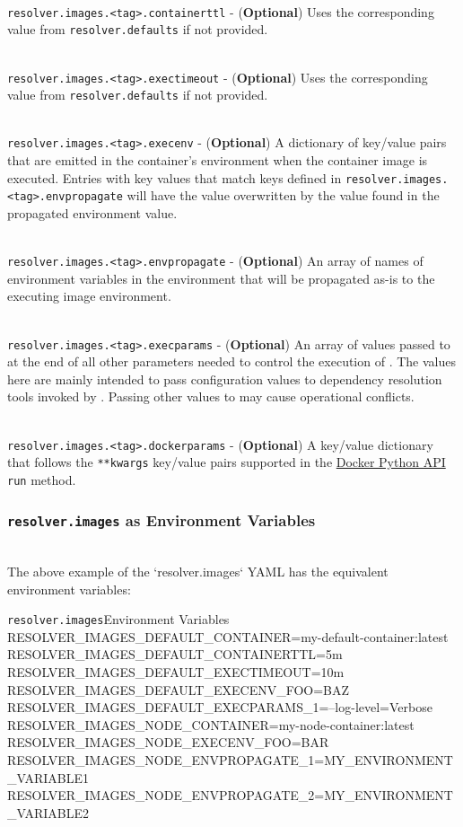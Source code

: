 \noindent\\\texttt{resolver.images.<tag>.containerttl} - (\textbf{Optional})  Uses the 
corresponding value from \texttt{resolver.defaults} if not provided.

\noindent\\\texttt{resolver.images.<tag>.exectimeout} - (\textbf{Optional})  Uses the corresponding 
value from \texttt{resolver.defaults} if not provided.

\noindent\\\texttt{resolver.images.<tag>.execenv} - (\textbf{Optional}) A dictionary of key/value 
pairs that are emitted in the container's environment when the container image is executed.  
Entries with key values that match keys defined in \texttt{resolver.images.<tag>.envpropagate} 
will have the value overwritten by the value found in the propagated environment value.

\noindent\\\texttt{resolver.images.<tag>.envpropagate} - (\textbf{Optional}) An array of names of 
environment variables in the \cxflowplusplus environment that will be propagated as-is to the 
executing image environment.

\noindent\\\texttt{resolver.images.<tag>.execparams} - (\textbf{Optional}) An array of values passed
to \scaresolver at the end of all other parameters needed to control the
execution of \scaresolver.  The values here are mainly intended to pass configuration
values to dependency resolution tools invoked by \scaresolver.  Passing other values
to \scaresolver may cause operational conflicts.

\noindent\\\texttt{resolver.images.<tag>.dockerparams} - (\textbf{Optional}) A key/value dictionary 
that follows the \texttt{**kwargs} key/value pairs supported in the 
\href{https://docker-py.readthedocs.io/en/stable/containers.html#docker.models.containers.ContainerCollection.run}{Docker Python API} 
\texttt{run} method.

\subsubsection{\texttt{resolver.images} as Environment Variables}

\noindent\\The above example of the `resolver.images` YAML has the equivalent environment variables:\\

\begin{code}{\texttt{resolver.images}}{Environment Variables}{}
RESOLVER_IMAGES_DEFAULT_CONTAINER=my-default-container:latest
RESOLVER_IMAGES_DEFAULT_CONTAINERTTL=5m
RESOLVER_IMAGES_DEFAULT_EXECTIMEOUT=10m
RESOLVER_IMAGES_DEFAULT_EXECENV_FOO=BAZ
RESOLVER_IMAGES_DEFAULT_EXECPARAMS_1=--log-level=Verbose
RESOLVER_IMAGES_NODE_CONTAINER=my-node-container:latest
RESOLVER_IMAGES_NODE_EXECENV_FOO=BAR
RESOLVER_IMAGES_NODE_ENVPROPAGATE_1=MY_ENVIRONMENT_VARIABLE1
RESOLVER_IMAGES_NODE_ENVPROPAGATE_2=MY_ENVIRONMENT_VARIABLE2
\end{code}